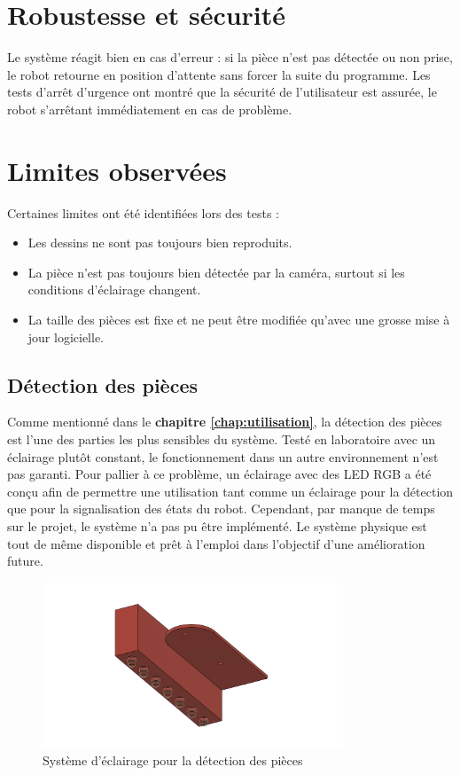 \section{Robustesse et sécurité}

Le système réagit bien en cas d'erreur : si la pièce n'est pas détectée ou non prise, le robot retourne en position d'attente sans forcer la suite du programme. Les tests d'arrêt d'urgence ont montré que la sécurité de l'utilisateur est assurée, le robot s'arrêtant immédiatement en cas de problème.

\section{Limites observées}

Certaines limites ont été identifiées lors des tests :
\begin{itemize}
    \item Les dessins ne sont pas toujours bien reproduits.
    \item La pièce n'est pas toujours bien détectée par la caméra, surtout si les conditions d'éclairage changent.
    \item La taille des pièces est fixe et ne peut être modifiée qu'avec une grosse mise à jour logicielle.
\end{itemize}

\subsection{Détection des pièces}
Comme mentionné dans le \textbf{chapitre \ref{chap:utilisation}}, la détection des pièces est l'une des parties les plus sensibles du système. Testé en laboratoire avec un éclairage plutôt constant, le fonctionnement dans un autre environnement n'est pas garanti. Pour pallier à ce problème, un éclairage avec des LED RGB a été conçu afin de permettre une utilisation tant comme un éclairage pour la détection que pour la signalisation des états du robot. Cependant, par manque de temps sur le projet, le système n'a pas pu être implémenté. Le système physique est tout de même disponible et prêt à l'emploi dans l'objectif d'une amélioration future.

\begin{figure}[H]
    \centering
    \includegraphics[width=0.8\textwidth]{assets/figures/porte led v3.png}
    \caption{Système d'éclairage pour la détection des pièces}
    \label{fig:led_detection}
\end{figure}


